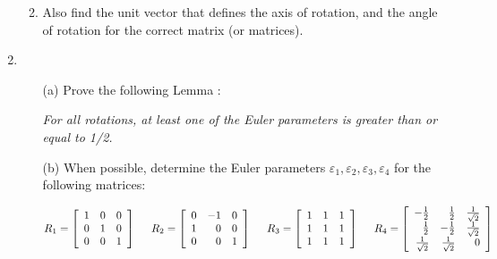 \begin{enumerate}
\begin{enumerate}[label=(\alph*)]
    \vspace{5cm}
    
    \item
   Also find the unit vector that defines the axis of rotation, and the angle of rotation for the correct matrix (or matrices). 
\end{enumerate}
\newpage

\item
  \begin{enumerate}
  \item[(a)] Prove the following Lemma :
  
  \textit{For all rotations, at least one of the Euler parameters is greater than or equal to 1/2.}
  
  \vspace{5cm}

  \item[(b)] When possible, determine the Euler parameters $\varepsilon_1, \varepsilon_2, \varepsilon_3, \varepsilon_4$ for the following
    matrices:

    \[
    R_1 =
    \left[
      \begin{array}{rrr}
	1 & 0 & 0 \\
    0 & 1 & 0 \\
    0 & 0 & 1
      \end{array}
    \right]
    \hspace{0.5cm}
    R_2 =
    \left[
      \begin{array}{rrr}
	0 & -1 & 0 \\
    1 & 0 & 0 \\
    0 & 0 & 1
      \end{array}
    \right]
    \hspace{0.5cm}
    R_3 =
    \left[
      \begin{array}{rrr}
	1 & 1 & 1 \\
    1 & 1 & 1 \\
    1 & 1 & 1
      \end{array}
    \right]
    \hspace{0.5cm}
    R_4 =
    \left[
      \begin{array}{rrr}
	-\frac{1}{2} &  \frac{1}{2} & \frac{1}{\sqrt{2}} \\
        \frac{1}{2} & -\frac{1}{2} & \frac{1}{\sqrt{2}} \\
        \frac{1}{\sqrt{2}} & \frac{1}{\sqrt{2}} & 0
      \end{array}
    \right]
    \]

  \end{enumerate}
\newpage


\end{enumerate}

